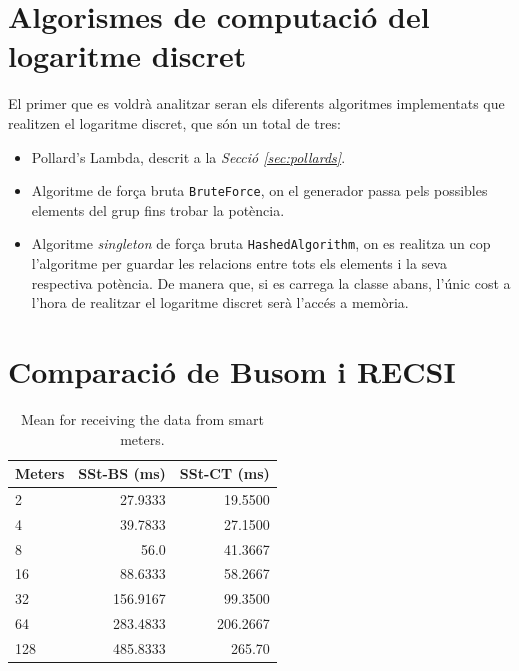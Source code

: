 \section{Algorismes de computació del logaritme discret}
El primer que es voldrà analitzar seran els diferents algoritmes implementats que realitzen el logaritme discret, que són un total de tres:
\begin{itemize}
	\item Pollard's Lambda, descrit a la \textit{Secció \ref{sec:pollards}}.
	\item Algoritme de força bruta \texttt{BruteForce}, on el generador passa pels possibles elements del grup fins trobar la potència.
	\item Algoritme \textit{singleton} de força bruta \texttt{HashedAlgorithm}, on es realitza un cop l'algoritme per guardar les relacions entre tots els elements i la seva respectiva potència. De manera que, si es carrega la classe abans, l'únic cost a l'hora de realitzar el logaritme discret serà l'accés a memòria.
\end{itemize}

\section{Comparació de Busom i RECSI}
\begin{table}[H]
	\centering
	\begin{tabular}{l|rr}
		Meters & SSt-BS (ms) & SSt-CT (ms) \\ \hline
		2      &     27.9333 &     19.5500 \\
		4      &     39.7833 &     27.1500 \\
		8      &        56.0 &     41.3667 \\
		16     &     88.6333 &     58.2667 \\
		32     &    156.9167 &     99.3500 \\
		64     &    283.4833 &    206.2667 \\
		128    &    485.8333 &      265.70
	\end{tabular}
	\caption{Mean for receiving the data from smart meters.}
	\label{ana:tab1}
\end{table}
